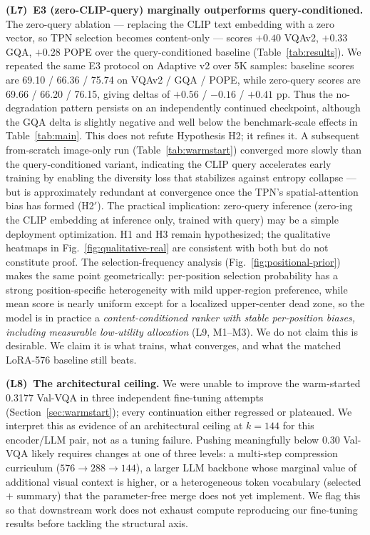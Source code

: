 \documentclass{article}
\begin{document}
\textbf{(L7)~E3 (zero-CLIP-query) marginally outperforms query-conditioned.}
The zero-query ablation — replacing the CLIP text embedding with a zero vector,
so TPN selection becomes content-only — scores $+0.40$ VQAv2, $+0.33$ GQA,
$+0.28$ POPE over the query-conditioned baseline (Table~\ref{tab:results}).
We repeated the same E3 protocol on Adaptive v2 over 5K samples: baseline
scores are 69.10 / 66.36 / 75.74 on VQAv2 / GQA / POPE, while zero-query
scores are 69.66 / 66.20 / 76.15, giving deltas of $+0.56$ / $-0.16$ /
$+0.41$ pp. Thus the no-degradation pattern persists on an independently
continued checkpoint, although the GQA delta is slightly negative and well below
the benchmark-scale effects in Table~\ref{tab:main}.
This does not refute Hypothesis H2; it refines it.
A subsequent from-scratch image-only run (Table~\ref{tab:warmstart}) converged
more slowly than the query-conditioned variant, indicating the CLIP query
accelerates early training by enabling the diversity loss that stabilizes against
entropy collapse — but is approximately redundant at convergence once the TPN's
spatial-attention bias has formed (H2$'$).
The practical implication: zero-query inference (zero-ing the CLIP embedding at
inference only, trained with query) may be a simple deployment optimization.
H1 and H3 remain hypothesized; the qualitative heatmaps in
Fig.~\ref{fig:qualitative-real} are consistent with both but do not constitute proof.
The selection-frequency analysis (Fig.~\ref{fig:positional-prior}) makes the
same point geometrically: per-position selection probability has a strong
position-specific heterogeneity with mild upper-region preference, while mean score
is nearly uniform except for a localized upper-center dead zone, so the model is in
practice a \emph{content-conditioned ranker with stable per-position biases,
including measurable low-utility allocation} (L9, M1--M3). We do not
claim this is desirable. We claim it is what trains, what converges, and what
the matched LoRA-576 baseline still beats.

\textbf{(L8)~The architectural ceiling.}
We were unable to improve the warm-started 0.3177 Val-VQA in three
independent fine-tuning attempts (Section~\ref{sec:warmstart}); every
continuation either regressed or plateaued. We interpret this as
evidence of an architectural ceiling at $k{=}144$ for this
encoder/LLM pair, not as a tuning failure. Pushing meaningfully below
$0.30$ Val-VQA likely requires changes at one of three levels: a
multi-step compression curriculum ($576\!\to\!288\!\to\!144$), a
larger LLM backbone whose marginal value of additional visual context
is higher, or a heterogeneous token vocabulary (selected $+$ summary)
that the parameter-free merge does not yet implement. We flag this so
that downstream work does not exhaust compute reproducing our
fine-tuning results before tackling the structural axis.
\end{document}
